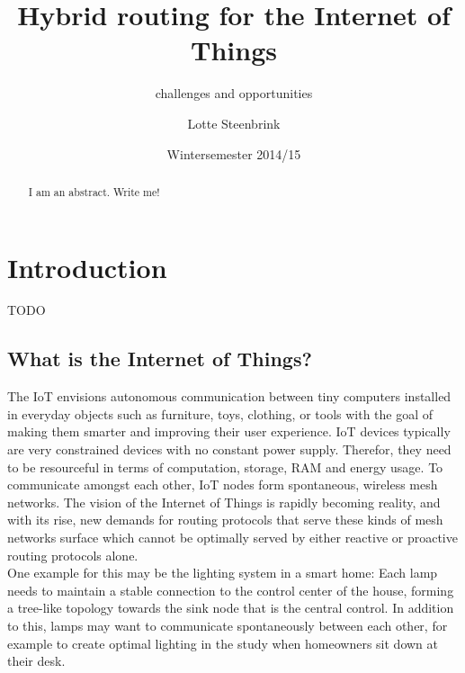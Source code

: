 \documentclass[a4paper,10pt]{scrartcl}
\begin{document}
\title{Hybrid routing for the Internet of Things}
\subtitle{challenges and opportunities}
\author{Lotte Steenbrink}
\date{Wintersemester 2014/15}
\maketitle

\begin{abstract}
I am an abstract. Write me!
\end{abstract}

\section{Introduction}
\label{sec:Intro}
TODO

\subsection{What is the Internet of Things?}
\label{subsec:IoT}
The \gls{IoT} envisions autonomous communication between tiny computers installed in everyday objects such as furniture, toys, clothing, or tools with the goal of making them smarter and improving their user experience. IoT devices typically are very constrained devices with no constant power supply. Therefor, they need to be resourceful in terms of computation, storage, RAM and energy usage.
To communicate amongst each other, IoT nodes form spontaneous, wireless mesh networks.
The vision of the Internet of Things is rapidly becoming reality, and with its rise, new demands for routing protocols that serve these kinds of mesh networks surface which cannot be optimally served by either reactive or proactive routing protocols alone.\\
One example for this may be the lighting system in a smart home: Each lamp needs to maintain a stable connection to the control center of the house, forming a tree-like topology towards the sink node that is the central control. In addition to this, lamps may want to communicate spontaneously between each other, for example to create optimal lighting in the study when homeowners sit down at their desk.
\end{document}
